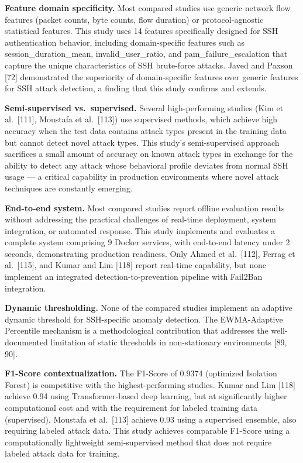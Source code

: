 \documentclass[
  a4paper]{report}
\newcounter{none} %
\begin{document}
\textbf{Feature domain specificity.} Most compared studies use generic
network flow features (packet counts, byte counts, flow duration) or
protocol-agnostic statistical features. This study uses 14 features
specifically designed for SSH authentication behavior, including
domain-specific features such as session\_duration\_mean,
invalid\_user\_ratio, and pam\_failure\_escalation that capture the
unique characteristics of SSH brute-force attacks. Javed and Paxson
{[}72{]} demonstrated the superiority of domain-specific features over
generic features for SSH attack detection, a finding that this study
confirms and extends.

\textbf{Semi-supervised vs.~supervised.} Several high-performing studies
(Kim et al.~{[}111{]}, Moustafa et al.~{[}113{]}) use supervised
methods, which achieve high accuracy when the test data contains attack
types present in the training data but cannot detect novel attack types.
This study's semi-supervised approach sacrifices a small amount of
accuracy on known attack types in exchange for the ability to detect any
attack whose behavioral profile deviates from normal SSH usage --- a
critical capability in production environments where novel attack
techniques are constantly emerging.

\textbf{End-to-end system.} Most compared studies report offline
evaluation results without addressing the practical challenges of
real-time deployment, system integration, or automated response. This
study implements and evaluates a complete system comprising 9 Docker
services, with end-to-end latency under 2 seconds, demonstrating
production readiness. Only Ahmed et al.~{[}112{]}, Ferrag et
al.~{[}115{]}, and Kumar and Lim {[}118{]} report real-time capability,
but none implement an integrated detection-to-prevention pipeline with
Fail2Ban integration.

\textbf{Dynamic thresholding.} None of the compared studies implement an
adaptive dynamic threshold for SSH-specific anomaly detection. The
EWMA-Adaptive Percentile mechanism is a methodological contribution that
addresses the well-documented limitation of static thresholds in
non-stationary environments {[}89, 90{]}.

\textbf{F1-Score contextualization.} The F1-Score of 0.9374 (optimized
Isolation Forest) is competitive with the highest-performing studies.
Kumar and Lim {[}118{]} achieve 0.94 using Transformer-based deep
learning, but at significantly higher computational cost and with the
requirement for labeled training data (supervised). Moustafa et
al.~{[}113{]} achieve 0.93 using a supervised ensemble, also requiring
labeled attack data. This study achieves comparable F1-Score using a
computationally lightweight semi-supervised method that does not require
labeled attack data for training.
\end{document}
